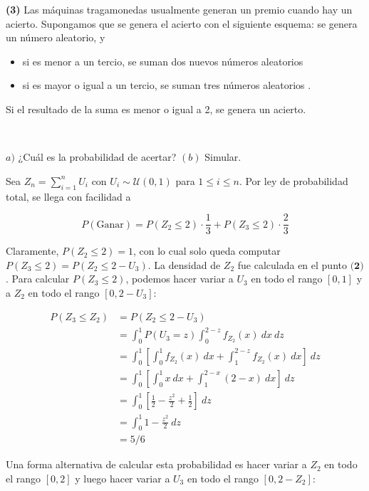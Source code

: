 \documentclass[a4paper, 12pt]{article}
\begin{document}
\begin{myframe}
\textbf{(3)} Las máquinas tragamonedas usualmente generan un premio cuando hay un acierto. Supongamos que se genera el acierto con el siguiente esquema: se genera un número aleatorio, y

\begin{itemize}
\item si es menor a un tercio, se suman dos nuevos números aleatorios
\item si es mayor o igual a un tercio, se suman tres números aleatorios .
\end{itemize}

Si el resultado de la suma es menor o igual a 2, se genera un acierto.

~

$a)$ ¿Cuál es la probabilidad de acertar? $(b)$ Simular.
\end{myframe}


Sea $Z_n = \sum_{i=1}^n U_i$ con $U_i \sim \mathcal{U}(0, 1)$ para $1 \leq i
\leq n$. Por ley de probabilidad total, se llega con facilidad a

\begin{equation*}
  P(\text{Ganar}) = P(Z_2 \leq 2) \cdot \frac{1}{3} + P(Z_3 \leq 2) \cdot
  \frac{2}{3}
\end{equation*}

Claramente, $P(Z_2 \leq 2) = 1$, con lo cual solo queda computar $P(Z_3 \leq
2) = P(Z_2 \leq 2 - U_3)$. La densidad de $Z_2$ fue calculada en el punto
$\textbf{(2)}$. Para calcular $P(Z_3 \leq 2)$, podemos hacer variar a $U_3$ en
todo el rango $[0, 1]$ y a $Z_2$ en todo el rango $[ 0, 2 - U_3 ]$:

\begin{align*}
  P(Z_3 \leq Z_2) 
  &= P(Z_2 \leq 2 - U_3) \\ 
  &=\int_0^1 P(U_3 = z) \int_{0}^{2-z} f_{Z_2}(x) ~ dx ~ dz \\ 
  &=\int_0^1 \left[ \int_0^1 f_{Z_2}(x) ~ dx + \int_1^{2 - z} f_{Z_2}(x) ~ dx
  \right] ~ dz \\ 
  &=\int_0^1 \left[ \int_0^1 x ~ dx + \int_1^{2-x}(2-x) ~ dx  \right] ~ dz \\ 
  &= \int_0^1 \left[ \frac{1}{2} - \frac{z^2}{2} + \frac{1}{2}\right]  ~ dz \\ 
  &=\int_0^1 1 - \frac{z^2}{2} ~ dz \\ 
  &= 5 / 6
\end{align*}


Una forma alternativa de calcular esta probabilidad es hacer variar a $Z_2$ en
todo el rango $[0, 2]$ y luego hacer variar a $U_3$ en todo el rango $[0, 2 -
Z_2]$:
\end{document}
